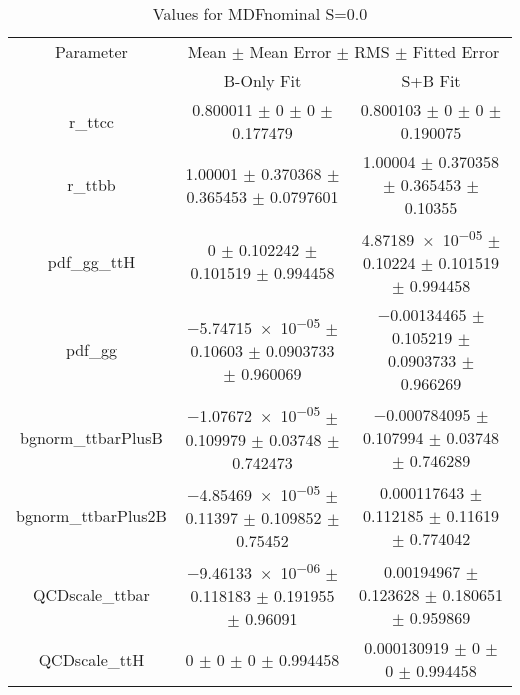 \begin{table}
\centering
\caption{Values for MDFnominal S=0.0}
\begin{tabular}{ccc}
\toprule
Parameter & \multicolumn{2}{c}{Mean $\pm$ Mean Error $\pm$ RMS $\pm$ Fitted Error}\\
 & B-Only Fit & S+B Fit\\
\midrule
r\_ttcc & \num{0.800011} $\pm$ \num{0} $\pm$ \num{0} $\pm$ \num{0.177479} & \num{0.800103} $\pm$ \num{0} $\pm$ \num{0} $\pm$ \num{0.190075}\\
r\_ttbb & \num{1.00001} $\pm$ \num{0.370368} $\pm$ \num{0.365453} $\pm$ \num{0.0797601} & \num{1.00004} $\pm$ \num{0.370358} $\pm$ \num{0.365453} $\pm$ \num{0.10355}\\
pdf\_gg\_ttH & \num{0} $\pm$ \num{0.102242} $\pm$ \num{0.101519} $\pm$ \num{0.994458} & \num{4.87189e-05} $\pm$ \num{0.10224} $\pm$ \num{0.101519} $\pm$ \num{0.994458}\\
pdf\_gg & \num{-5.74715e-05} $\pm$ \num{0.10603} $\pm$ \num{0.0903733} $\pm$ \num{0.960069} & \num{-0.00134465} $\pm$ \num{0.105219} $\pm$ \num{0.0903733} $\pm$ \num{0.966269}\\
bgnorm\_ttbarPlusB & \num{-1.07672e-05} $\pm$ \num{0.109979} $\pm$ \num{0.03748} $\pm$ \num{0.742473} & \num{-0.000784095} $\pm$ \num{0.107994} $\pm$ \num{0.03748} $\pm$ \num{0.746289}\\
bgnorm\_ttbarPlus2B & \num{-4.85469e-05} $\pm$ \num{0.11397} $\pm$ \num{0.109852} $\pm$ \num{0.75452} & \num{0.000117643} $\pm$ \num{0.112185} $\pm$ \num{0.11619} $\pm$ \num{0.774042}\\
QCDscale\_ttbar & \num{-9.46133e-06} $\pm$ \num{0.118183} $\pm$ \num{0.191955} $\pm$ \num{0.96091} & \num{0.00194967} $\pm$ \num{0.123628} $\pm$ \num{0.180651} $\pm$ \num{0.959869}\\
QCDscale\_ttH & \num{0} $\pm$ \num{0} $\pm$ \num{0} $\pm$ \num{0.994458} & \num{0.000130919} $\pm$ \num{0} $\pm$ \num{0} $\pm$ \num{0.994458}\\
\bottomrule
\end{tabular}
\end{table}